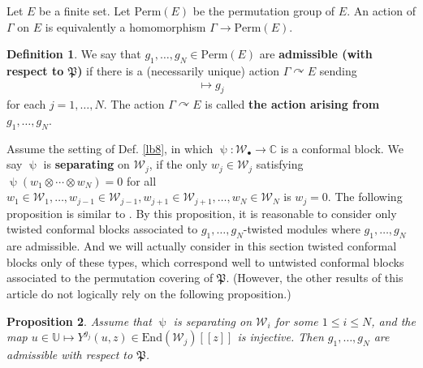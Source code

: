 \documentclass[11pt,b5paper,notitlepage]{article}
\theoremstyle{definition}
\newtheorem{df}{Definition}[subsection]
\theoremstyle{plain}
\newtheorem{pp}[df]{Proposition}
\newcommand{\fk}{\mathfrak}
\newcommand{\mc}{\mathcal}
\newcommand{\End}{\mathrm{End}} %
\newcommand{\blt}{\bullet}
\newcommand{\Ubb}{\mathbb U}
\newcommand{\Cbb}{\mathbb C}
\newcommand{\Perm}{\mathrm{Perm}}
\numberwithin{equation}{subsection}
\begin{document}
Let $E$ be a finite set. Let $\Perm(E)$ be the permutation group of $E$. \index{ESE@$E,\Perm(E)$} An action of $\Gamma$ on $E$ is equivalently a homomorphism $\Gamma\rightarrow\Perm(E)$. 

\begin{df}\label{lb61}
We say that $g_1,\dots,g_N\in\Perm(E)$ are \textbf{admissible (with respect to $\fk P$)}  if there is a (necessarily unique) action $\Gamma\curvearrowright E$ sending
\begin{align}
	[\upalpha_j]\mapsto g_j	\label{eq2}
\end{align}
for each $j=1,\dots, N$. The action $\Gamma\curvearrowright E$ is called \textbf{the action arising from $g_1,\dots,g_N$}.
\end{df}



Assume the setting of Def. \ref{lb8}, in which $\uppsi:\mc W_\blt\rightarrow\Cbb$ is a conformal block. We say $\uppsi$ is \textbf{separating} on $\mc W_j$, if the only $w_j\in\mc W_j$ satisfying $\uppsi(w_1\otimes\cdots\otimes w_N)=0$ for all $w_1\in\mc W_1,\dots,w_{j-1}\in\mc W_{j-1},w_{j+1}\in\mc W_{j+1},\dots,w_N\in\mc W_N$ is $w_j=0$. The following proposition is similar to \cite[Thm. 4.7]{Hua18}. By this proposition, it is reasonable to consider only twisted conformal blocks associated to $g_1,\dots,g_N$-twisted modules where $g_1,\dots,g_N$ are admissible. And we will actually consider in this section  twisted conformal blocks only of these types, which correspond well to untwisted conformal blocks associated to the permutation covering of $\fk P$. (However, the other results of this article do not logically rely on the following proposition.)

\begin{pp}
Assume that $\uppsi$ is separating on $\mc W_i$ for some $1\leq i\leq N$, and the map $u\in\Ubb\mapsto Y^{g_j}(u,z)\in\End(\mc W_j)[[z]]$ is injective. Then $g_1,\dots,g_N$ are admissible with respect to $\fk P$.
\end{pp}
\end{document}
